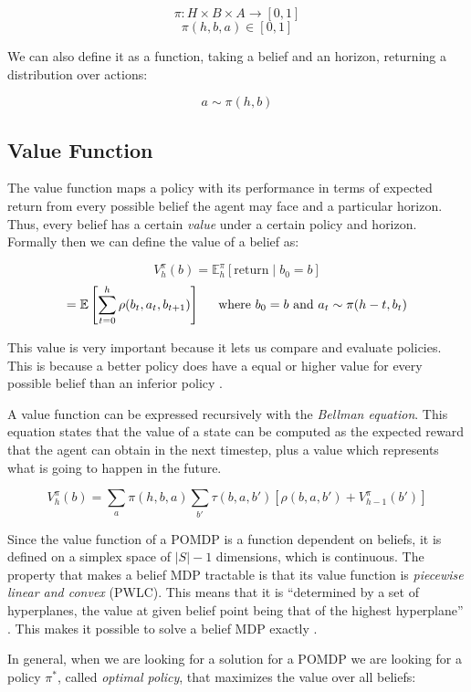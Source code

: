\[ \pi : H \times B \times A \rightarrow [0,1] \]
\[ \pi(h, b, a) \in [0,1] \]

We can also define it as a function, taking a belief and an horizon, returning a distribution over
actions:

\[ a \sim \pi(h, b) \]

\subsection{Value Function}

The value function maps a policy with its performance in terms of expected return from every
possible belief the agent may face and a particular horizon. Thus, every belief has a certain
\textit{value} under a certain policy and horizon. Formally then we can define the value of a belief
as:

\[ V^\pi_{h}(b) = \mathbb{E}^\pi_h \left [\text{return} \mid b_0 = b \right ] \]
\[ = \mathbb{E} \left [\sum_{t=0}^{h} \rho(b_{t}, a_t, b_{t+1}) \right ]
    \hspace{0.5cm}\text{where }b_0 = b \text{ and }a_t \sim \pi(h-t, b_t) \]

This value is very important because it lets us compare and evaluate policies. This is because a
better policy does have a equal or higher value for every possible belief than an inferior policy
\cite{cit:suttonbarto}.

A value function can be expressed recursively with the \textit{Bellman equation}. This equation
states that the value of a state can be computed as the expected reward that the agent can obtain in
the next timestep, plus a value which represents what is going to happen in the future.

\[ V^{\pi}_{h}(b) = \sum_a \pi(h, b, a) \sum_{b'} \tau(b, a, b') \left [ \rho(b, a, b') +
V^{\pi}_{h-1}(b') \right ] \]

Since the value function of a POMDP is a function dependent on beliefs, it is defined on a simplex
space of $|S|-1$ dimensions, which is continuous. The property that makes a belief MDP tractable is
that its value function is \textit{piecewise linear and convex} (PWLC). This means that it is
``determined by a set of hyperplanes, the value at given belief point being that of the highest
hyperplane'' \cite{cit:rpomdp}. This makes it possible to solve a belief MDP exactly
\cite{cit:pomdp}.

In general, when we are looking for a solution for a POMDP we are looking for a policy $\pi^*$, called
\textit{optimal policy}, that maximizes the value over all beliefs:

